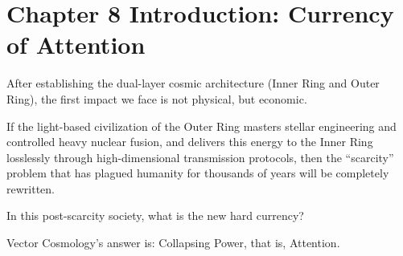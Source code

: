 \section*{Chapter 8 Introduction: Currency of Attention}

After establishing the dual-layer cosmic architecture (Inner Ring and Outer Ring), the first impact we face is not physical, but economic.

If the light-based civilization of the Outer Ring masters stellar engineering and controlled heavy nuclear fusion, and delivers this energy to the Inner Ring losslessly through high-dimensional transmission protocols, then the ``scarcity'' problem that has plagued humanity for thousands of years will be completely rewritten.

In this post-scarcity society, what is the new hard currency?

Vector Cosmology's answer is: Collapsing Power, that is, Attention.

